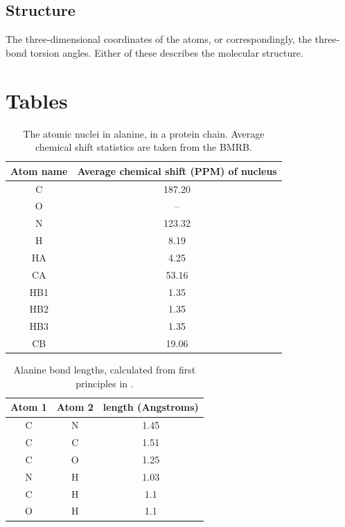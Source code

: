 \subsection*{Structure} 
The three-dimensional coordinates of the atoms, or correspondingly, the
three-bond torsion angles.  Either of these describes the molecular structure.



\clearpage
\section{Tables}

\begin{table}[h]
  \begin{tabular}{ | c | c | }
    \hline
    Atom name   &  Average chemical shift (PPM) of nucleus \\  \hline
    C           &  187.20     \\  \hline
    O           &  --         \\  \hline
    N           &  123.32     \\  \hline
    H           &  8.19       \\  \hline
    HA          &  4.25       \\  \hline
    CA          &  53.16      \\  \hline
    HB1         &  1.35       \\  \hline
    HB2         &  1.35       \\  \hline    
    HB3         &  1.35       \\  \hline
    CB          &  19.06      \\  \hline
  \end{tabular}
  \caption[The atomic nuclei in alanine, in a protein chain.]
          {The atomic nuclei in alanine, in a protein chain.
           Average chemical shift statistics are taken from the BMRB.}
  \label{alanine_atoms}
\end{table}

\begin{table}
  \begin{tabular}{ | c | c | c | }
    \hline
    Atom 1  &   Atom 2  &  length (Angstroms)   \\  \hline
    C   &   N   &   1.45  \\  \hline
    C   &   C   &   1.51  \\  \hline
    C   &   O   &   1.25  \\  \hline
    N   &   H   &   1.03  \\  \hline
    C   &   H   &   1.1   \\  \hline
    O   &   H   &   1.1   \\  \hline
  \end{tabular}
  \caption[Alanine bond lengths, calculated from first principles.]
          {Alanine bond lengths, calculated from first principles
           in \cite{alanine_sreepad}.}
  \label{alanine_bond_lengths}
\end{table}

